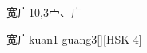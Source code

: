 \begin{entry}{宽广}{10,3}{⼧、⼴}
  \begin{phonetics}{宽广}{kuan1 guang3}[][HSK 4]
  \end{phonetics}
\end{entry}
